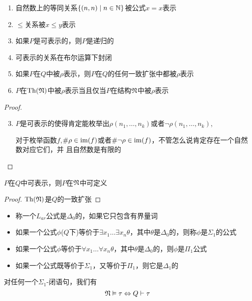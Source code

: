 \documentclass[11pt]{article}
\begin{document}
\begin{lemma}[]
\begin{enumerate}
\item 自然数上的等同关系\(\{(n,n)\mid n\in\mathbb{N}\}\)被公式\(x=x\)表示
\item \(\le\)关系被\(x\le y\)表示
\item 如果\(P\)是可表示的，则\(P\)是递归的
\item 可表示的关系在布尔运算下封闭
\item 如果\(P\)在\(Q\)中被\(\rho\)表示，则\(P\)在\(Q\)的任何一致扩张中都被\(\rho\)表示
\item \(P\)在\(\operatorname{Th}(\mathfrak{N})\)中被\(\rho\)表示当且仅当\(P\)在结构\(\mathfrak{N}\)中被\(\rho\)表示
\end{enumerate}
\end{lemma}

\begin{proof}
\begin{enumerate}
\setcounter{enumi}{2}
\item \(P\)是可表示的使得肯定能枚举出\(\rho(n_1,\dots,n_k)\)或者\(\neg\rho(n_1,\dots,n_k)\),

对于枚举函数\(f\),\(\#\rho\in\operatorname{im}(f)\)或者\(\#\neg\rho\in\operatorname{im}(f)\)，不管怎么说肯定存在一个自然数对应它们，并
且自然数是有限的
\end{enumerate}
\end{proof}

\begin{corollary}[]
\(P\)在\(Q\)中可表示，则\(P\)在\(\mathfrak{N}\)中可定义
\end{corollary}

\begin{proof}
\(\operatorname{Th}(\mathfrak{N})\)是\(Q\)的一致扩张
\end{proof}

\begin{itemize}
\item 称一个\(L_{ar}\)公式是\(\Delta_0\)的，如果它只包含有界量词
\item 如果一个公式\(\phi\)(\(Q\)下)等价于\(\exists x_1\dots\exists x_n\theta\)，其中\(\theta\)是\(\Delta_0\)的，则称\(\phi\)是\(\Sigma_1\)的公式
\item 如果一个公式\(\phi\)等价于\(\forall x_1\dots\forall x_n\theta\)，其中\(\theta\)是\(\Delta_0\)的，则\(\phi\)是\(\Pi_1\)公式
\item 如果一个公式既等价于\(\Sigma_1\)，又等价于\(\Pi_1\)，则它是\(\Delta_1\)的
\end{itemize}


\begin{theorem}
对任何一个\(\Sigma_1\)-闭语句，我们有
\begin{equation*}
\mathfrak{N}\vDash\tau\Leftrightarrow Q\vdash\tau
\end{equation*}
\end{theorem}
\end{document}
